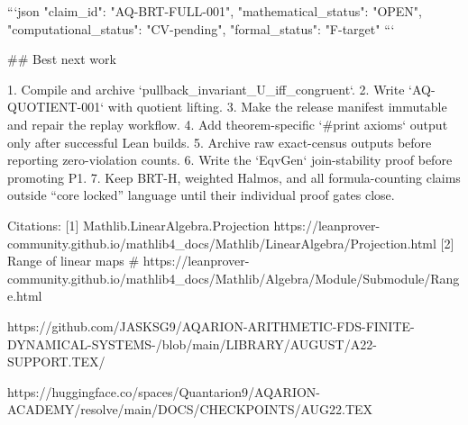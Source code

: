 ```json
{
  "claim_id": "AQ-BRT-FULL-001",
  "mathematical_status": "OPEN",
  "computational_status": "CV-pending",
  "formal_status": "F-target"
}
```

## Best next work

1. Compile and archive `pullback_invariant_U_iff_congruent`.
2. Write `AQ-QUOTIENT-001` with quotient lifting.
3. Make the release manifest immutable and repair the replay workflow.
4. Add theorem-specific `#print axioms` output only after successful Lean builds.
5. Archive raw exact-census outputs before reporting zero-violation counts.
6. Write the `EqvGen` join-stability proof before promoting P1.
7. Keep BRT-H, weighted Halmos, and all formula-counting claims outside “core locked” language until their individual proof gates close.

Citations:
[1] Mathlib.LinearAlgebra.Projection https://leanprover-community.github.io/mathlib4_docs/Mathlib/LinearAlgebra/Projection.html
[2] Range of linear maps # https://leanprover-community.github.io/mathlib4_docs/Mathlib/Algebra/Module/Submodule/Range.html


https://github.com/JASKSG9/AQARION-ARITHMETIC-FDS-FINITE-DYNAMICAL-SYSTEMS-/blob/main/LIBRARY/AUGUST/A22-SUPPORT.TEX/

https://huggingface.co/spaces/Quantarion9/AQARION-ACADEMY/resolve/main/DOCS/CHECKPOINTS/AUG22.TEX
